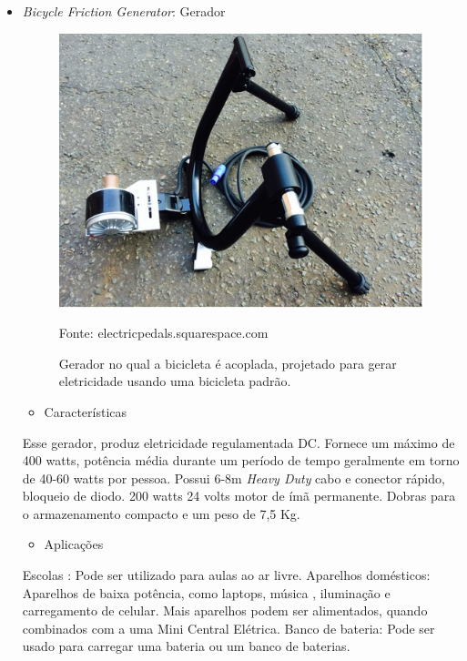 \pagebreak
\begin{itemize}
	\item \textit{Bicycle Friction Generator}: Gerador

	\begin{figure}[H]
	 \centering
	\label{Gerador bicicleta}
	 \includegraphics[keepaspectratio=true,scale=0.8]{figuras/bicycle.png}
	 \caption{Gerador no qual a bicicleta é acoplada, projetado para gerar eletricidade usando uma bicicleta padrão.}
	 \small{Fonte: electricpedals.squarespace.com}
	\end{figure}

	\begin{itemize}
	\item Características
	\end{itemize}

		Esse gerador, produz eletricidade regulamentada DC. Fornece um máximo de 400 watts, potência média durante um 	período de tempo geralmente em torno de 40-60 watts por pessoa. Possui 6-8m \textit{Heavy Duty} cabo e conector rápido, bloqueio de diodo. 200 watts 24 volts motor de ímã permanente. Dobras para o armazenamento compacto e um peso de 7,5 Kg.
	
\begin{itemize}
	\item Aplicações
\end{itemize}	
	
	Escolas : Pode ser utilizado para aulas ao ar livre.
Aparelhos domésticos: Aparelhos de baixa potência, como laptops, música , iluminação e carregamento de celular. Mais aparelhos podem ser alimentados, quando combinados com a uma Mini Central Elétrica.
Banco de bateria: Pode ser usado para carregar uma bateria ou um banco de baterias.

\end{itemize}

